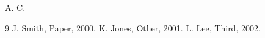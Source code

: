 \documentclass{article}
\begin{document}
A\cite{a,b,c}. C\citep{b}.
\begin{thebibliography}{9}
 J. Smith, Paper, 2000.
 K. Jones, Other, 2001.
 L. Lee, Third, 2002.
\end{thebibliography}
\end{document}
